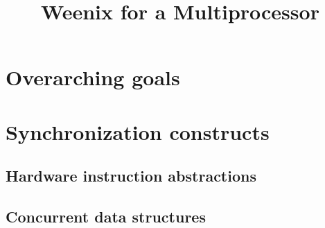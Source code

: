 \documentclass{article}
\begin{document}
\title{Weenix for a  Multiprocessor}

\maketitle

\section{Overarching goals}

\section{Synchronization constructs}

\subsection{Hardware instruction abstractions}

\subsection{Concurrent data structures}
\end{document}
